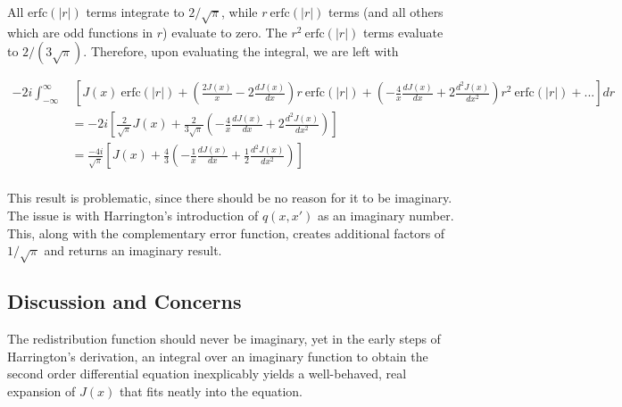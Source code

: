 \documentclass[onecolumn]{aastex63}
\begin{document}
All $\mathrm{erfc}(|r|)$ terms integrate to $2/\sqrt{\pi}$, while $r\ \mathrm{erfc}(|r|)$ terms (and all others which are odd functions in $r$) evaluate to zero. The $r^2\ \mathrm{erfc}(|r|)$ terms evaluate to $2/(3\sqrt{\pi})$. Therefore, upon evaluating the integral, we are left with

\begin{equation}
    \begin{split}
       -2i\int_{-\infty}^{\infty}&\ \left[J(x)\ \mathrm{erfc}\left(|r|\right) + \left(\frac{2J(x)}{x} - 2\frac{dJ(x)}{dx}\right) r\ \mathrm{erfc}\left(|r|\right) + \left(-\frac{4}{x}\frac{dJ(x)}{dx} + 2\frac{d^2 J(x)}{dx^2}\right)r^2\ \mathrm{erfc}\left(|r|\right) + ...\right]dr \\
       &= -2i \left[\frac{2}{\sqrt{\pi}} J(x) + \frac{2}{3\sqrt{\pi}}\left(-\frac{4}{x}\frac{dJ(x)}{dx} + 2\frac{d^2 J(x)}{dx^2}\right)\right] \\
      &= \frac{-4i}{\sqrt{\pi}} \left[J(x) + \frac{4}{3}\left(-\frac{1}{x}\frac{dJ(x)}{dx} + \frac{1}{2}\frac{d^2 J(x)}{dx^2}\right)\right] \\
   \end{split}
\end{equation}

This result is problematic, since there should be no reason for it to be imaginary. The issue is with Harrington's introduction of $q(x, x')$ as an imaginary number. This, along with the complementary error function, creates additional factors of $1/\sqrt{\pi}$ and returns an imaginary result.

\subsection{Discussion and Concerns}

The redistribution function should never be imaginary, yet in the early steps of Harrington's derivation, an integral over an imaginary function to obtain the second order differential equation inexplicably yields a well-behaved, real expansion of $J(x)$ that fits neatly into the equation.


\end{document}
